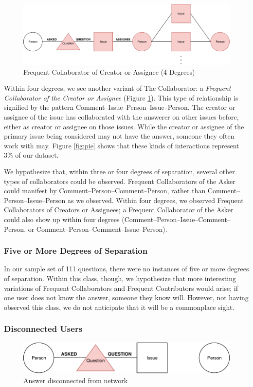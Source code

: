 \documentclass[conference]{IEEEtran}
\begin{document}
\begin{figure}[ht]
	\centering
	\includegraphics[width=\linewidth]{img/4degCollab.pdf}
	\caption{Frequent Collaborator of Creator or Assignee (4 Degrees)}
	\label{fig:4degContrib}
\end{figure}

Within four degrees, we see another variant of The Collaborator: a \textit{Frequent Collaborator of the Creator or Assignee} (Figure \ref{fig:4degContrib}). This type of relationship is signified by the pattern Comment--Issue--Person--Issue--Person. The creator or assignee of the issue has collaborated with the answerer on other issues before, either as creator or assignee on those issues. While the creator or assignee of the primary issue being considered may not have the answer, someone they often work with may. Figure \ref{fig:pie} shows that these kinds of interactions represent 3\% of our dataset.

We hypothesize that, within three or four degrees of separation, several other types of collaborators could be observed. Frequent Collaborators of the Asker could manifest by Comment--Person--Comment--Person, rather than Comment--Person--Issue--Person as we observed. Within four degrees, we observed Frequent Collaborators of Creators or Assignees; a Frequent Collaborator of the Asker could also show up within four degrees (Comment--Person--Issue--Comment--Person, or Comment--Person--Comment--Issue--Person). 


\subsubsection{Five or More Degrees of Separation}
In our sample set of 111 questions, there were no instances of five or more degrees of separation. Within this class, though, we hypothesize that more interesting variations of Frequent Collaborators and Frequent Contributors would arise; if one user does not know the answer, someone they know will. However, not having observed this class, we do not anticipate that it will be a commonplace sight.

\subsubsection{Disconnected Users}
\begin{figure}[ht]
	\centering
	\includegraphics[width=0.9\linewidth]{img/disconnected.pdf}
	\caption{Answer disconnected from network}
	\label{fig:disconnected}
\end{figure}
\end{document}
